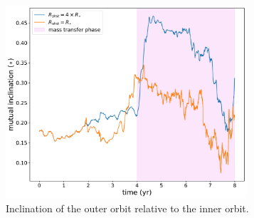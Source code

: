 \begin{figure}[H]
    \centering
    \includegraphics[width=0.8\textwidth]{Thesis/graphs/accretion_case/accretion_inc.pdf}
    \caption{Inclination of the outer orbit relative to the inner orbit.}
    \label{fig:accretion_inc}
\end{figure}

